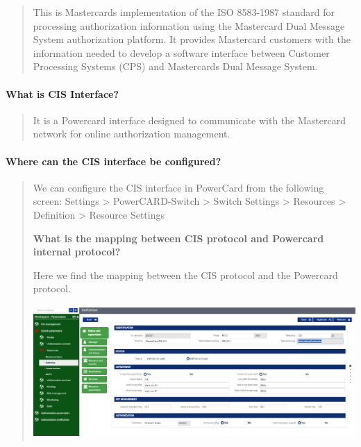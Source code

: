 \documentclass[12pt,a4paper]{report}
\begin{document}
\begin{quote}
This is Mastercard\textquotesingle s implementation of the ISO 8583-1987
standard for processing authorization information using the Mastercard
Dual Message System authorization platform. It provides Mastercard
customers with the information needed to develop a software interface
between Customer Processing Systems (CPS) and
Mastercard\textquotesingle s Dual Message System.
\end{quote}

\hypertarget{what-is-cis-interface}{%
\paragraph{\texorpdfstring{\textbf{What is CIS
Interface?}}{What is CIS Interface?}}\label{what-is-cis-interface}}

\begin{quote}
It is a Powercard interface designed to communicate with the Mastercard
network for online authorization management.
\end{quote}

\hypertarget{where-can-the-cis-interface-be-configured}{%
\paragraph{\texorpdfstring{\textbf{Where can the CIS interface be
configured?}}{Where can the CIS interface be configured?}}\label{where-can-the-cis-interface-be-configured}}

\begin{quote}
We can configure the CIS interface in PowerCard from the following
screen: Settings \textgreater{} PowerCARD-Switch \textgreater{} Switch
Settings \textgreater{} Resources \textgreater{} Definition
\textgreater{} Resource Settings

\textbf{What is the mapping between CIS protocol and Powercard internal
protocol?}

Here we find the mapping between the CIS protocol and the Powercard
protocol.

\includegraphics[width=5in,height=1.99042in]{vertopal_d1b0b2209edd4c6aa8254f57daa0953b/media/image27.png}
\end{quote}
\end{document}
